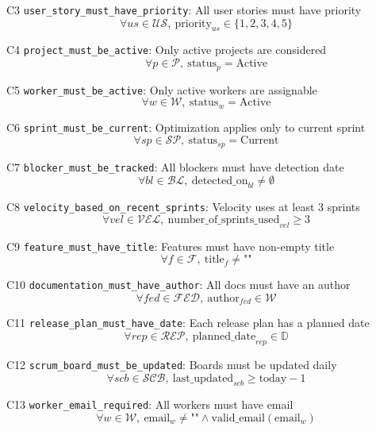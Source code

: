 \documentclass[12pt]{article}
\begin{document}
    \item[C3] \texttt{user\_story\_must\_have\_priority}: All user stories must have priority
    \[
    \forall us \in \mathcal{US},\ \text{priority}_{us} \in \{1,2,3,4,5\}
    \]

    \item[C4] \texttt{project\_must\_be\_active}: Only active projects are considered
    \[
    \forall p \in \mathcal{P},\ \text{status}_p = \text{Active}
    \]

    \item[C5] \texttt{worker\_must\_be\_active}: Only active workers are assignable
    \[
    \forall w \in \mathcal{W},\ \text{status}_w = \text{Active}
    \]

    \item[C6] \texttt{sprint\_must\_be\_current}: Optimization applies only to current sprint
    \[
    \forall sp \in \mathcal{SP},\ \text{status}_{sp} = \text{Current}
    \]

    \item[C7] \texttt{blocker\_must\_be\_tracked}: All blockers must have detection date
    \[
    \forall bl \in \mathcal{BL},\ \text{detected\_on}_{bl} \neq \emptyset
    \]

    \item[C8] \texttt{velocity\_based\_on\_recent\_sprints}: Velocity uses at least 3 sprints
    \[
    \forall vel \in \mathcal{VEL},\ \text{number\_of\_sprints\_used}_{vel} \geq 3
    \]

    \item[C9] \texttt{feature\_must\_have\_title}: Features must have non-empty title
    \[
    \forall f \in \mathcal{F},\ \text{title}_f \neq \text{""}
    \]

    \item[C10] \texttt{documentation\_must\_have\_author}: All docs must have an author
    \[
    \forall fed \in \mathcal{FED},\ \text{author}_{fed} \in \mathcal{W}
    \]

    \item[C11] \texttt{release\_plan\_must\_have\_date}: Each release plan has a planned date
    \[
    \forall rep \in \mathcal{REP},\ \text{planned\_date}_{rep} \in \mathbb{D}
    \]

    \item[C12] \texttt{scrum\_board\_must\_be\_updated}: Boards must be updated daily
    \[
    \forall scb \in \mathcal{SCB},\ \text{last\_updated}_{scb} \geq \text{today} - 1
    \]

    \item[C13] \texttt{worker\_email\_required}: All workers must have email
    \[
    \forall w \in \mathcal{W},\ \text{email}_w \neq \text{""} \land \text{valid\_email}(\text{email}_w)
    \]
\end{document}
